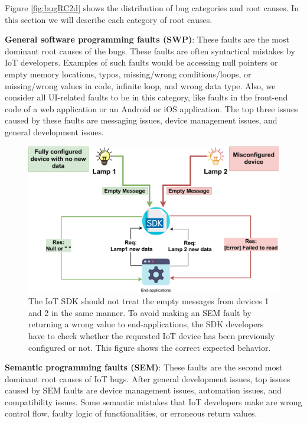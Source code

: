 Figure \ref{fig:bugRC2d} shows the distribution of bug categories and root causes. In this section we will describe each category of root causes. 

\textbf{General software programming faults (SWP)}: These faults are the most dominant root causes of the bugs. These faults are often syntactical mistakes by IoT developers. Examples of such faults would be accessing null pointers or empty memory locations, typos, missing/wrong conditions/loops, or missing/wrong values in code, infinite loop, and wrong data type. Also, we consider all UI-related faults to be in this category, like faults in the front-end code of a web application or an Android or iOS application. The top three issues caused by these faults are messaging issues, device management issues, and general development issues.

 \begin{figure}[ht]
  \centering
   \includegraphics[width=\linewidth]{imgs/sem.pdf}
  \caption{The IoT SDK should not treat the empty messages from devices 1 and 2 in the same manner. To avoid making an SEM fault by returning a wrong value to end-applications, the SDK developers have to check whether the requested IoT device has been previously configured or not. This figure shows the correct expected behavior.}
  \label{fig:sem}
\end{figure}

\textbf{Semantic programming faults (SEM)}: These faults are the second most dominant root causes of IoT bugs. After general development issues, top issues caused by SEM faults are device management issues, automation issues, and compatibility issues. Some semantic mistakes that IoT developers make are wrong control flow, faulty logic of functionalities, or erroneous return values. 

